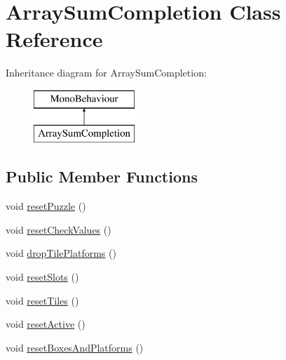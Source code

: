 \hypertarget{class_array_sum_completion}{}\section{Array\+Sum\+Completion Class Reference}
\label{class_array_sum_completion}
Inheritance diagram for Array\+Sum\+Completion\+:\begin{figure}[H]
\begin{center}
\leavevmode
\includegraphics[height=2.000000cm]{class_array_sum_completion}
\end{center}
\end{figure}
\subsection*{Public Member Functions}
\begin{DoxyCompactItemize}
\item 
void \hyperlink{class_array_sum_completion_a7ebbac41382a93bf539032555a3c9bd9}{reset\+Puzzle} ()
\item 
void \hyperlink{class_array_sum_completion_a3ae23072215cde0cdce19c8f8b773b7b}{reset\+Check\+Values} ()
\item 
void \hyperlink{class_array_sum_completion_ac1c819eeab2598e8c2c2e1e78e15a666}{drop\+Tile\+Platforms} ()
\item 
void \hyperlink{class_array_sum_completion_a033797d55e28346be6d4821f3bdc2daa}{reset\+Slots} ()
\item 
void \hyperlink{class_array_sum_completion_a9219153273ef00f35c1ccb98cf408af3}{reset\+Tiles} ()
\item 
void \hyperlink{class_array_sum_completion_a9c8cbe4d07015cd0e6c958e39e0e92d2}{reset\+Active} ()
\item 
void \hyperlink{class_array_sum_completion_a1289c469259345582c0227f7a617a19f}{reset\+Boxes\+And\+Platforms} ()
\end{DoxyCompactItemize}
